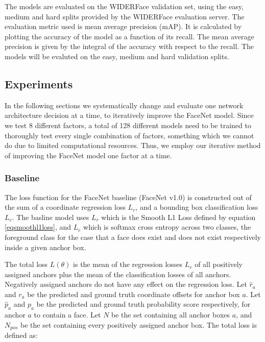 \documentclass[a4paper, twoside]{article}
\begin{document}
The models are evaluated on the WIDERFace validation set, using the easy, medium and hard splits provided by the WIDERFace evaluation server. The evaluation metric used is mean average precision (mAP). It is calculated by plotting the accuracy of the model as a function of its recall. The mean average precision is given by the integral of the accuracy with respect to the recall. The models will be evaluted on the easy, medium and hard validation splits.

\subsection{Experiments}
In the following sections we systematically change and evaluate one network architecture decision at a time, to iteratively improve the FaceNet model. Since we test 8 different factors, a total of 128 different models need to be trained to thoroughly test every single combination of factors, something which we cannot do due to limited computational resources. Thus, we employ our iterative method of improving the FaceNet model one factor at a time.

\subsubsection{Baseline}
The loss function for the FaceNet baseline (FaceNet v1.0) is constructed out of the sum of a coordinate regression loss $L_r$, and a bounding box classification loss $L_c$. The basline model uses $L_r$ which is the Smooth L1 Loss \cite{cs231n} defined by equation \eqref{eqsmoothl1loss}, and $L_c$ which is softmax cross entropy across two classes, the foreground class for the case that a face does exist and does not exist respectively inside a given anchor box.

The total loss $L(\theta)$ is the mean of the regression losses $L_r$ of all positively assigned anchors plus the mean of the classification losses of all anchors. Negatively assigned anchors do not have any effect on the regression loss. Let $\hat{r}_a$ and $r_a$  be the predicted and ground truth coordinate offsets for anchor box $a$. Let $\hat{p}_a$ and $p_a$ be the predicted and ground truth probability score respectively, for anchor $a$ to contain a face. Let $N$ be the set containing all anchor boxes $a$, and $N_{pos}$ be the set containing every positively assigned anchor box. The total loss is defined as:
\end{document}
